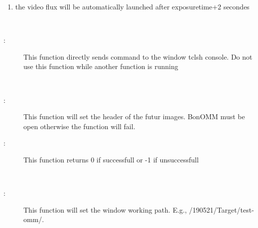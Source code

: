\documentclass[letterpaper,10pt,english]{sphinxmanual}
\begin{document}
\begin{fulllineitems}
\begin{fulllineitems}
\begin{description}
\begin{enumerate}
\item {} 
the video flux will be automatically launched after exposuretime+2 secondes

\end{enumerate}

\end{description}

\end{fulllineitems}


\begin{fulllineitems}
\label{\detokenize{index:python_andor.command.send}}~\begin{description}
\item[{:}] \leavevmode
This function directly sends command to the window tclsh console. Do not use this function while another function is running

\end{description}

\end{fulllineitems}


\begin{fulllineitems}
\label{\detokenize{index:python_andor.command.set_header}}~\begin{description}
\item[{:}] \leavevmode
This function will set the header of the futur images. BonOMM must be open otherwise the function will fail.

\item[{:}] \leavevmode
This function returns 0 if successfull or -1 if unsuccessfull

\end{description}

\end{fulllineitems}


\begin{fulllineitems}
\label{\detokenize{index:python_andor.command.set_path}}~\begin{description}
\item[{:}] \leavevmode
This function will set the window working path. E.g., /190521/Target/test-omm/.


\end{description}
\end{fulllineitems}
\end{fulllineitems}
\end{document}
